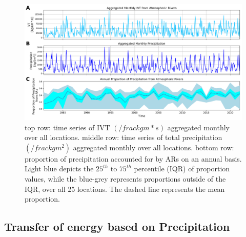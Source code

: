 \documentclass[12pts,draft]{AR_analysis_}
\begin{document}
\begin{figure}
\centering
\includegraphics[width=1.0\textwidth]{./images/IVT_Precip_proportion_over_time.png}
\caption{top row: time series of IVT $\left(/frac{kg}{m*s}\right)$ aggregated monthly 
	over all locations.
	middle row: time series of total precipitation $\left(/frac{kg}{m^{2}}\right)$ 
	aggregated monthly over all
	locations. bottom row: proportion of precipitation accounted for by
	ARs on an annual basis. Light blue depicts the $25^{th}$ to $75^{th}$
	percentile (IQR) of proportion values, while the blue-grey represents 
	proportions outside of the IQR, over all 25 locations. The dashed line 
	represents the mean proportion.}
\label{fig:IVT_Precip_proportion_over_time}
\end{figure}

\subsection{Transfer of energy based on Precipitation}
\end{document}
